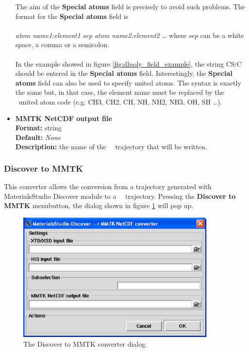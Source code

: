 \documentclass[a4paper,11pt]{report}
\begin{document}
\begin{itemize}
The aim of the \textbf{Special atoms} field is precisely to avoid such problems. The format for the 
\textbf{Special atoms} field is
\\\\
\textit{atom name1:element1 sep atom name2:element2 \ldots} where \textit{sep} can be a white space, a comma or a semicolon.
\\\\
In the example showed in figure \ref{fig:dlpoly_field_example}, the string CS:C should be entered in the \textbf{Special atoms} field.
Interestingly, the \textbf{Special atoms} field can also be used to specify united atoms. The syntax is exactly the same but, in 
that case, the element name must be replaced by the \MMTK\ united atom code (e.g. CH3, CH2, CH, NH, NH2, NH3, OH, SH \ldots ).

\item \textbf{MMTK NetCDF output file}\\
\textbf{Format:} string\\
\textbf{Default:} \textit{None}\\
\textbf{Description:} the name of the \MMTK\ \NetCDF\ trajectory that will be written.
\end{itemize}

\subsubsection{Discover to MMTK}
\label{discover_to_mmtk}
This converter allows the conversion from a trajectory generated with MaterialsStudio Discover module \cite{Discover} to a 
\MMTK\ \NetCDF\ trajectory. Pressing the \textbf{Discover to MMTK} menubutton, the dialog shown in figure \ref{fig:discover_converter} will pop up.
\newpage
\begin{figure}[h!]
\begin{center}
\includegraphics[width=10cm]{Figures/discover_converter.eps}
\end{center}
\caption[The Discover to MMTK converter dialog]{The Discover to MMTK converter dialog.}
\label{fig:discover_converter}
\end{figure}   
\end{document}
